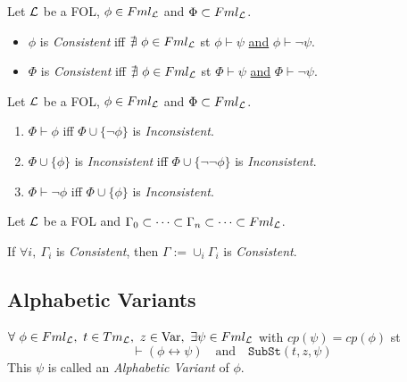 \documentclass[11pt,a4paper]{article}
\begin{document}
Let $\mathcal{L}$ be a FOL, $\phi\in Fml_{\mathcal{L}}$ and $\Phi\subset Fml_{\mathcal{L}}$.
\begin{itemize}
	\item $\phi$ is \textit{Consistent} iff $\nexists\ \phi\in Fml_{\mathcal{L}}$ st $\phi\vdash\psi$ \underline{and} $\phi\vdash\neg\psi$.
	\item $\Phi$ is \textit{Consistent} iff $\nexists\ \phi\in Fml_{\mathcal{L}}$ st $\Phi\vdash\psi$ \underline{and} $\Phi\vdash\neg\psi$.
\end{itemize}




Let $\mathcal{L}$ be a FOL, $\phi\in Fml_{\mathcal{L}}$ and $\Phi\subset Fml_{\mathcal{L}}$.
\begin{enumerate}
	\item $\Phi\vdash\phi$ iff $\Phi\cup\{\neg\phi\}$ is \textit{Inconsistent}.
	\item $\Phi\cup\{\phi\}$ is \textit{Inconsistent} iff $\Phi\cup\{\neg\neg\phi\}$ is \textit{Inconsistent}.
	\item $\Phi\vdash\neg\phi$ iff $\Phi\cup\{\phi\}$ is \textit{Inconsistent}.
\end{enumerate}


Let $\mathcal{L}$ be a FOL and $\Gamma_0\subset\dots\subset\Gamma_n\subset\dots\subset Fml_{\mathcal{L}}$.
\begin{center}
If $\forall i,\ \Gamma_i$ is \textit{Consistent}, then $\Gamma:=\cup_i\Gamma_i$ is \textit{Consistent}.
\end{center}

\subsection{Alphabetic Variants}

$\forall\ \phi\in Fml_\LL,\ t\in Tm_\LL ,\ z\in\var,\ \exists \psi\in Fml_\LL$ with $cp(\psi)=cp(\phi)$ st
$$\vdash(\phi\leftrightarrow\psi)\quad\text{and}\quad\mathtt{SubSt}(t,z,\psi)$$
\nb This $\psi$ is called an \textit{Alphabetic Variant} of $\phi$.
\end{document}

